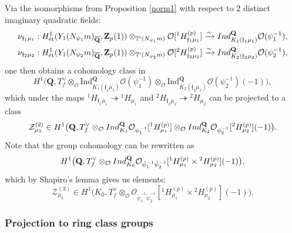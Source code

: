 \documentclass[10pt,letterpaper]{amsart}
\theoremstyle{plain}
\theoremstyle{definition}
\theoremstyle{definition}
\theoremstyle{plain}
\theoremstyle{plain}
\theoremstyle{plain}
\theoremstyle{remark}
\numberwithin{equation}{section}
\newcommand{\fkf}{\mathfrak{f}}
\DeclareMathOperator{\et}{\acute{e}t}
\newcommand{\Q}{\mathbf{Q}}
\newcommand{\Z}{\mathbf{Z}}
\begin{document}
Via the isomorphisms from Proposition \ref{norm1} with respect to $2$ distinct imaginary quadratic fields:
\begin{align*}
\nu_{\fkf_1\mu_1}:H^1_{\et}(Y_1(N_{\psi_1}m)_{\overline{\Q}},\Z_p(1))\otimes_{\mathbb{T}'(N_{\psi_1}m)}\mathcal{O}[^{1}H_{\mathfrak{f}_1\mu_1}^{(p)}]&\xrightarrow{\sim}{\rm Ind}^{\Q}_{K_1(\fkf_1\mu_1)}\mathcal{O}(\psi_{1}^{-1}),\\
\nu_{\fkf_2\mu_2}:H^1_{\et}(Y_1(N_{\psi_2}m)_{\overline{\Q}},\Z_p(1))\otimes_{\mathbb{T}'(N_{\psi_2}m)}\mathcal{O}[^{2}H_{\mathfrak{f}_2\mu_2}^{(p)}]&\xrightarrow{\sim}{\rm Ind}^{\Q}_{K_2(\fkf_2\mu_2)}\mathcal{O}(\psi_{2}^{-1}),
\end{align*}
one then obtains a cohomology class in
\[
H^1\bigl(\Q,T_f^{\vee}\otimes_{\mathcal{O}}\text{Ind}^{\Q}_{K_1(\fkf_1\mu_1)}\mathcal{O}(\psi_1^{-1})\otimes_{\mathcal{O}}\text{Ind}^{\Q}_{K_2(\fkf_2\mu_2)}\mathcal{O}(\psi_2^{-1})(-1)\bigr),
\]
which under the maps $
^{1}H_{\fkf_1\mu_1}\twoheadrightarrow {^{1}H_{\mu_1}}$ and $^{2}H_{\fkf_2\mu_2}\twoheadrightarrow {^{2}H_{\mu_2}}$ can be projected to a class
\begin{equation}\label{eq:inf-res-decomp}
\mathcal{Z}_{\mu_3}^{(2)}\in H^1\bigl(\Q,T_f^{\vee}\otimes_{\mathcal{O}}{\rm Ind}^{\Q}_{K_1}\mathcal{O}_{\psi_1^{-1}}[^{1}H_{\mu_1}^{(p)}]\otimes_{\mathcal{O}}{\rm Ind}^{\Q}_{K_2}\mathcal{O}_{\psi_2^{-1}}[^{2}H_{\mu_2}^{(p)}](-1)\bigr).
\end{equation}
Note that the group cohomology can be rewritten as
\[
H^1\bigl(\Q,T_f^{\vee}\otimes_{\mathcal{O}}{\rm Ind}^{\Q}_{K_0}\mathcal{O}_{\tilde{\psi}_1^{-1}\tilde{\psi}_2^{-1}}[{^{1}H_{\mu_1}^{(p)}}\times {^{2}H_{\mu_2}^{(p)}}](-1)\bigr),\]
which by Shapiro's lemma gives us elements:
\begin{equation}
    \label{eqn:pre-shapiro}\mathcal{Z}_{\mu_3}^{(3)}\in
H^1\bigl(K_0,T_f^{\vee}\otimes_{\mathcal{O}}\mathcal{O}_{\tilde{\psi}_1^{-1}\tilde{\psi}_2^{-1}}[{^{1}H_{\mu_1}^{(p)}}\times {^{2}H_{\mu_2}^{(p)}}](-1)\bigr).
\end{equation}




\subsubsection{Projection to ring class groups}
\end{document}
